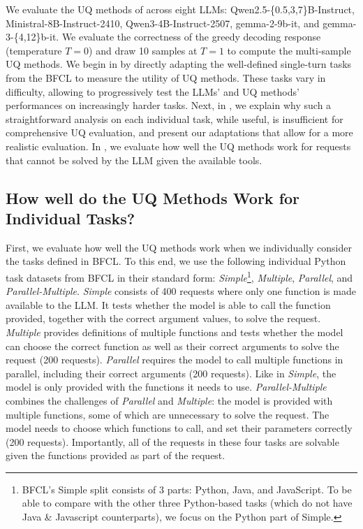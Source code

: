 We evaluate the UQ methods of  across eight LLMs:
Qwen2.5-\{0.5,3,7\}B-Instruct, 
Ministral-8B-Instruct-2410, Qwen3-4B-Instruct-2507, gemma-2-9b-it, and gemma-3-\{4,12\}b-it. We evaluate the correctness of the greedy decoding response (temperature $T\!=\!0$) and draw 10 samples at $T\!=\!1$ to compute the multi-sample UQ methods. We begin in  by directly adapting the well-defined single-turn tasks from the BFCL to measure the utility of UQ methods.
These tasks vary in difficulty, allowing to progressively test the LLMs' and UQ methods' performances on increasingly harder tasks.
Next, in , we explain why such a straightforward analysis on each individual task, while useful, is insufficient for comprehensive UQ evaluation, and present our adaptations that allow for a more realistic evaluation.
In , we evaluate how well the UQ methods work for requests that cannot be solved by the LLM given the available tools.


\setlength{\tabcolsep}{9pt}
\renewcommand{\arraystretch}{1.3}
\begin{table}[!htbp]

\label{tab:combined_all_tasks}
\end{table}



\subsection{How well do the UQ Methods Work for Individual Tasks?}
\label{sec:individual_tasks}
First, we evaluate how well the UQ methods work when we individually consider the tasks defined in BFCL.
To this end, we use the following individual Python task datasets from BFCL in their standard form: 
\emph{Simple}\footnote{BFCL's Simple split consists of 3 parts: Python, Java, and JavaScript. To be able to compare with the other three Python-based tasks (which do not have Java \& Javascript counterparts), we focus on the Python part of Simple.},
\emph{Multiple}, \emph{Parallel}, and \emph{Parallel-Multiple}.
\emph{Simple} consists of 400 requests where only one function is made available to the LLM. 
It tests whether the model is able to call the function provided, together with the correct argument values, to solve the request.
\emph{Multiple} provides definitions of multiple functions and tests whether the model can choose the correct function as well as their correct arguments to solve the request (200 requests). 
\emph{Parallel} requires the model to call multiple functions in parallel, including their correct arguments (200 requests). 
Like in \emph{Simple}, the model is only provided with the functions it needs to use.
\emph{Parallel-Multiple} combines the challenges of \emph{Parallel} and \emph{Multiple}: 
the model is provided with multiple functions, some of which are unnecessary to solve the request.
The model needs to choose which functions to call, and set their parameters correctly (200 requests).
Importantly, all of the requests in these four tasks are solvable given the functions provided as part of the request.

